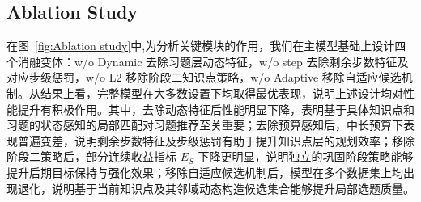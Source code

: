 \documentclass[11pt,a4paper]{article}
\begin{document}
\subsection{Ablation Study}
在图~\ref{fig:Ablation study}中,为分析关键模块的作用，我们在主模型基础上设计四个消融变体：w/o Dynamic 去除习题层动态特征，w/o step 去除剩余步数特征及对应步级惩罚，w/o L2 移除阶段二知识点策略，w/o Adaptive 移除自适应候选机制。从结果上看，完整模型在大多数设置下均取得最优表现，说明上述设计均对性能提升有积极作用。其中，去除动态特征后性能明显下降，表明基于具体知识点和习题的状态感知的局部匹配对习题推荐至关重要；去除预算感知后，中长预算下表现普遍变差，说明剩余步数特征及步级惩罚有助于提升知识点层的规划效率；移除阶段二策略后，部分连续收益指标 $E_S$ 下降更明显，说明独立的巩固阶段策略能够提升后期目标保持与强化效果；移除自适应候选机制后，模型在多个数据集上均出现退化，说明基于当前知识点及其邻域动态构造候选集合能够提升局部选题质量。
\end{document}
